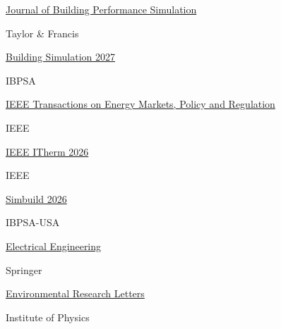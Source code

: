 \documentclass[]{Keval-resume}
\begin{document}
{{\begin{minipage}[t]{.6\textwidth}
	\textbullet{} \href{https://www.tandfonline.com/journals/tbps20}{{Journal of Building Performance Simulation}}
\end{minipage}%
\begin{minipage}[t]{.4\textwidth}
	\hfill Taylor \& Francis
\end{minipage}
\begin{minipage}[t]{.6\textwidth}
	\textbullet{} \href{https://bs2027.org/}{{Building Simulation 2027}}
\end{minipage}%
\begin{minipage}[t]{.4\textwidth}
	\hfill IBPSA
\end{minipage}
\begin{minipage}[t]{.6\textwidth}
	\textbullet{} \href{https://ieeexplore.ieee.org/xpl/RecentIssue.jsp?punumber=9794458}{{IEEE Transactions on Energy Markets, Policy and Regulation}}
\end{minipage}%
\begin{minipage}[t]{.4\textwidth}
	\hfill IEEE
\end{minipage}
\begin{minipage}[t]{.6\textwidth}
	\textbullet{} \href{https://www.ieee-itherm.net}{{IEEE ITherm 2026}}
\end{minipage}%
\begin{minipage}[t]{.4\textwidth}
	\hfill IEEE
\end{minipage}
\begin{minipage}[t]{.6\textwidth}
	\textbullet{} \href{https://simbuild.ibpsa.us}{{Simbuild 2026}}
\end{minipage}%
\begin{minipage}[t]{.4\textwidth}
	\hfill IBPSA-USA
\end{minipage}
\begin{minipage}[t]{.65\textwidth}
	\textbullet{} \href{https://link.springer.com/journal/202}{{Electrical Engineering}}
\end{minipage}%
\begin{minipage}[t]{.35\textwidth}
	\hfill Springer
\end{minipage}
\begin{minipage}[t]{.65\textwidth}
	\textbullet{} \href{https://iopscience.iop.org/journal/1748-9326}{{Environmental Research Letters}}
\end{minipage}%
\begin{minipage}[t]{.35\textwidth}
	\hfill Institute of Physics
\end{minipage}

}}
\end{document}
